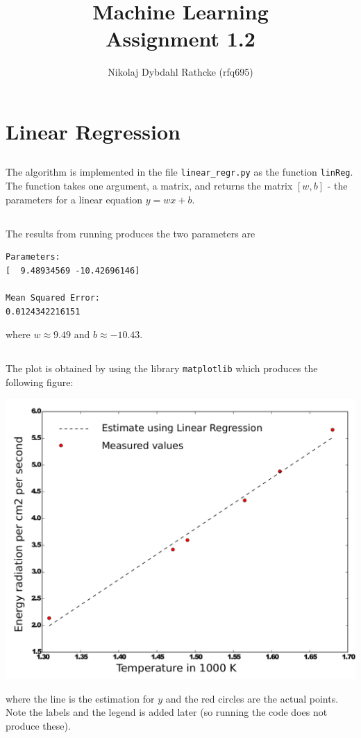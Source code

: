 \documentclass[a4paper]{article}
\author{Nikolaj Dybdahl Rathcke (rfq695)}
\title{Machine Learning \\ Assignment 1.2}
\begin{document}
\maketitle

\section{Linear Regression}
\subsection{}
The algorithm is implemented in the file \texttt{linear\_regr.py} as the function \texttt{linReg}. The function takes one argument, a matrix, and returns the matrix $[w, b]$ - the parameters for a linear equation $y=wx+b$.

\subsection{}
The results from running produces the two parameters are
\begin{verbatim}
Parameters:
[  9.48934569 -10.42696146]

Mean Squared Error:
0.0124342216151
\end{verbatim}
where $w\approx 9.49$ and $b\approx -10.43$.

\subsection{}
The plot is obtained by using the library \texttt{matplotlib} which produces the following figure:
\begin{center}
\includegraphics[scale=0.5]{fig1}
\end{center}
where the line is the estimation for $y$ and the red circles are the actual points. Note the labels and the legend is added later (so running the code does not produce these).
\end{document}
